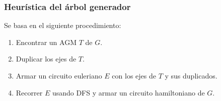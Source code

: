 \subsubsection*{Heur\'istica del \'arbol generador}

Se basa en el siguiente procedimiento:

\begin{enumerate}
\item Encontrar un AGM $T$ de $G$.
\item Duplicar los ejes de $T$.
\item Armar un circuito euleriano $E$ con los ejes de $T$ y sus duplicados.
\item Recorrer $E$ usando DFS y armar un circuito hamiltoniano de $G$.
\end{enumerate}